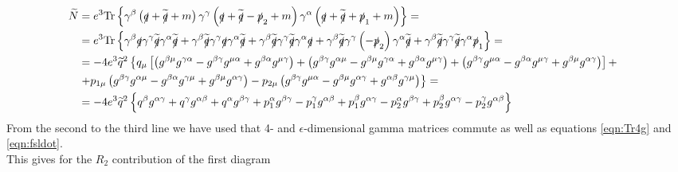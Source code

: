 \begin{align*}
\widetilde{N} & = e^3 \mathrm{Tr} \left\lbrace \gamma^{\beta} \left( \slashed{q} + \widetilde{\slashed{q}} + m \right) \gamma^{\gamma} \left( \slashed{q} + \widetilde{\slashed{q}} - \slashed{p}_2 + m \right) \gamma^{\alpha} \left( \slashed{q} + \widetilde{\slashed{q}} + \slashed{p}_1 + m \right) \right\rbrace = & \\
& = e^3 \mathrm{Tr} \left\lbrace \gamma^{\beta} \slashed{q} \gamma^{\gamma} \widetilde{\slashed{q}} \gamma^{\alpha} \widetilde{\slashed{q}} + \gamma^{\beta} \widetilde{\slashed{q}} \gamma^{\gamma} \slashed{q} \gamma^{\alpha} \widetilde{\slashed{q}} + \gamma^{\beta} \widetilde{\slashed{q}} \gamma^{\gamma} \widetilde{\slashed{q}} \gamma^{\alpha} \slashed{q} + \gamma^{\beta} \widetilde{\slashed{q}} \gamma^{\gamma} \left( - \slashed{p}_2 \right) \gamma^{\alpha} \widetilde{\slashed{q}} + \gamma^{\beta} \widetilde{\slashed{q}} \gamma^{\gamma} \widetilde{\slashed{q}} \gamma^{\alpha} \slashed{p}_1 \right\rbrace = & \\
& = - 4e^3 \widetilde{q}^2 \left\lbrace q_{\mu} \left[ \left( g^{\beta\mu}g^{\gamma\alpha} - g^{\beta\gamma}g^{\mu\alpha} + g^{\beta\alpha}g^{\mu\gamma} \right) + \left( g^{\beta\gamma}g^{\alpha\mu} - g^{\beta\mu}g^{\gamma\alpha} + g^{\beta\alpha}g^{\mu\gamma} \right) + \left( g^{\beta\gamma}g^{\mu\alpha} - g^{\beta\alpha}g^{\mu\gamma} + g^{\beta\mu}g^{\alpha\gamma} \right) \right] + \right. & \\ 
& \left. + p_{1\mu} \left( g^{\beta\gamma}g^{\alpha\mu} - g^{\beta\alpha}g^{\gamma\mu} + g^{\beta\mu}g^{\alpha\gamma} \right) - p_{2\mu} \left( g^{\beta\gamma}g^{\mu\alpha} - g^{\beta\mu}g^{\alpha\gamma} + g^{\alpha\beta}g^{\gamma\mu} \right) \right\rbrace = & \\
& = -4e^3 \widetilde{q}^2 \left\lbrace q^{\beta}g^{\alpha\gamma} + q^{\gamma}g^{\alpha\beta} + q^{\alpha}g^{\beta\gamma} + p_1^{\alpha}g^{\beta\gamma} - p_1^{\gamma}g^{\alpha\beta} + p_1^{\beta}g^{\alpha\gamma} - p_2^{\alpha}g^{\beta\gamma} + p_2^{\beta}g^{\alpha\gamma} - p_2^{\gamma}g^{\alpha\beta} \right\rbrace &
\end{align*}
From the second to the third line we have used that 4- and $\epsilon$-dimensional gamma matrices commute as well as equations \ref{eqn:Tr4g} and \ref{eqn:fsldot}. \\
This gives for the $R_2$ contribution of the first diagram
